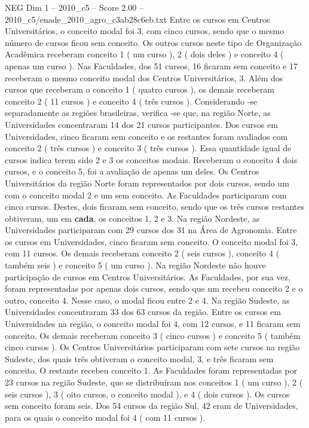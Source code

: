 \begin{textsample}{NEG Dim 1 – 2010\_c5 – Score 2.00 – 2010\_c5/enade\_2010\_agro\_c3ab28c6eb.txt}
Entre os cursos em Centros Universitários, o conceito modal foi 3, com cinco cursos, sendo que o mesmo número de cursos ficou sem conceito.
Os outros cursos neste tipo de Organização Acadêmica receberam conceito 1 ( um curso ), 2 ( dois deles ) e conceito 4 ( apenas um curso ).
Nas Faculdades, dos 51 cursos, 16 ficaram sem conceito e 17 receberam o mesmo conceito modal dos Centros Universitários, 3.
Além dos cursos que receberam o conceito 1 ( quatro cursos ), os demais receberam conceito 2 ( 11 cursos ) e conceito 4 ( três cursos ).
Considerando -se separadamente as regiões brasileiras, verifica -se que, na região Norte, as Universidades concentraram 14 dos 21 cursos participantes.
Dos cursos em Universidades, cinco ficaram sem conceito e os restantes foram avaliados com conceito 2 ( três cursos ) e conceito 3 ( três cursos ).
Essa quantidade igual de cursos indica terem sido 2 e 3 os conceitos modais.
Receberam o conceito 4 dois cursos, e o conceito 5, foi a avaliação de apenas um deles.
Os Centros Universitários da região Norte foram representados por dois cursos, sendo um com o conceito modal 2 e um sem conceito.
As Faculdades participaram com cinco cursos.
Destes, dois ficaram sem conceito, sendo que os três cursos restantes obtiveram, um em \textbf{cada}, os conceitos 1, 2 e 3.
Na região Nordeste, as Universidades participaram com 29 cursos dos 31 na Área de Agronomia.
Entre os cursos em Universidades, cinco ficaram sem conceito.
O conceito modal foi 3, com 11 cursos.
Os demais receberam conceito 2 ( seis cursos ), conceito 4 ( também seis ) e conceito 5 ( um curso ).
Na região Nordeste não houve participação de cursos em Centros Universitários.
As Faculdades, por sua vez, foram representadas por apenas dois cursos, sendo que um recebeu conceito 2 e o outro, conceito 4.
Nesse caso, o modal ficou entre 2 e 4.
Na região Sudeste, as Universidades concentraram 33 dos 63 cursos da região.
Entre os cursos em Universidades na região, o conceito modal foi 4, com 12 cursos, e 11 ficaram sem conceito.
Os demais receberam conceito 3 ( cinco cursos ) e conceito 5 ( também cinco cursos ).
Os Centros Universitários participaram com sete cursos na região Sudeste, dos quais três obtiveram o conceito modal, 3, e três ficaram sem conceito.
O restante recebeu conceito 1.
As Faculdades foram representadas por 23 cursos na região Sudeste, que se distribuíram nos conceitos 1 ( um curso ), 2 ( seis cursos ), 3 ( oito cursos, o conceito modal ), e 4 ( dois cursos ).
Os cursos sem conceito foram seis.
Dos 54 cursos da região Sul, 42 eram de Universidades, para os quais o conceito modal foi 4 ( com 11 cursos ).

\end{textsample}
